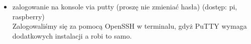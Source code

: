 \documentclass[a4paper,12pt]{extarticle}  %
\begin{document}
\begin{enumerate}
\begin{itemize}
\begin{figure}[H]
			            \centering
		            \end{figure}
		      \item zalogowanie na konsole via putty (proszę nie zmieniać hasła) (dostęp: pi, raspberry)\\
		            Zalogowaliśmy się za pomocą OpenSSH w terminalu, gdyż PuTTY wymaga dodatkowych instalacji a robi to samo.
		            \begin{figure}[H]
			            \centering
		            \end{figure}
	      \end{itemize}


\end{enumerate}
\end{document}
